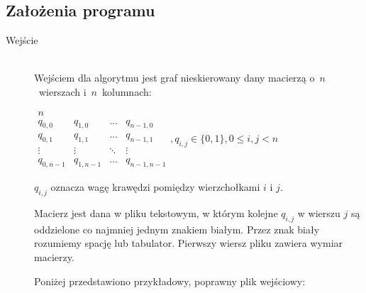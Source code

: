 \documentclass[12pt, a4paper]{article}
\begin{document}
\subsection{Założenia programu}
\begin{description}
	\item[Wejście] \hfill \\
Wejściem dla algorytmu jest graf nieskierowany dany macierzą o~$n$~wierszach i~$n$~kolumnach:

\bigskip
$ 
\begin{array}{llll}
n \\
q_{0,0} & q_{1,0} & \ldots & q_{n-1,0} \\
q_{0,1} & q_{1,1} & \ldots & q_{n-1,1} \\
\vdots  & \vdots  & \ddots & \vdots  \\
q_{0,n-1} & q_{1,n-1} & \ldots & q_{n-1,n-1} 
\end{array}
, q_{i,j} \in \{0,1\}, 0 \leq i,j < n
$
\bigskip

$q_{i,j}$ oznacza wagę krawędzi pomiędzy wierzchołkami $i$ i $j$.
\par\vspace{\baselineskip}
Macierz jest dana w pliku tekstowym, w którym kolejne $q_{i,j}$ w wierszu $j$ są oddzielone co najmniej jednym znakiem białym. Przez znak biały rozumiemy
spację lub tabulator. Pierwszy wiersz pliku zawiera wymiar macierzy.

Poniżej przedstawiono przykładowy, poprawny plik wejściowy:


\end{description}
\end{document}
